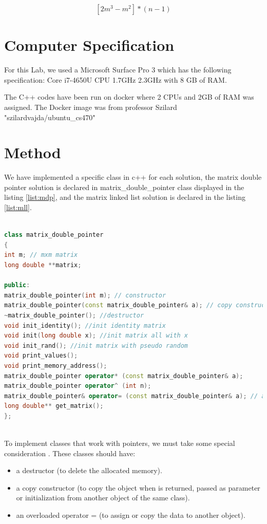 \documentclass[12pt]{article}
\begin{document}
    \begin{equation} \label{eq:time2}
    [2m^3-m^2]*(n-1)
    \end{equation} 
     
    \section{Computer Specification}
     
    For this Lab, we used a Microsoft Surface Pro 3 which has the following specification: Core i7-4650U CPU 1.7GHz 2.3GHz with 8 GB of RAM.
    
    The C++ codes have been run on docker where 2 CPUs and 2GB of RAM was assigned. The Docker image was from professor Szilard "szilardvajda/ubuntu\_cs470"
    
    
    \section{Method}
     We have implemented a specific class in c++ for each solution, the matrix double pointer solution is declared in matrix\_double\_pointer class displayed in the listing \ref{list:mdp}, and the matrix linked list solution is declared in the listing \ref{list:mll}.
    
    \begin{lstlisting}[language=c++, caption={matrix\_double\_pointer class}, label={list:mdp}]

class matrix_double_pointer
{
int m; // mxm matrix
long double **matrix;

public:
matrix_double_pointer(int m); // constructor
matrix_double_pointer(const matrix_double_pointer& a); // copy constructor for return
~matrix_double_pointer(); //destructor
void init_identity(); //init identity matrix
void init(long double x); //init matrix all with x
void init_rand(); //init matrix with pseudo random 
void print_values();
void print_memory_address();
matrix_double_pointer operator* (const matrix_double_pointer& a);
matrix_double_pointer operator^ (int n);
matrix_double_pointer& operator= (const matrix_double_pointer& a); // assigment
long double** get_matrix();
};
    
    \end{lstlisting}
    To implement classes that work with pointers, we must take some special consideration \cite{class.pointer}. These classes should have:
    \begin{itemize}
        \item a destructor (to delete the allocated memory).
        \item a copy constructor (to copy the object when is returned, passed as parameter or initialization from another object of the same class). 
        \item an overloaded operator = (to assign or copy the data to another object).  
    \end{itemize}
     
\end{document}

